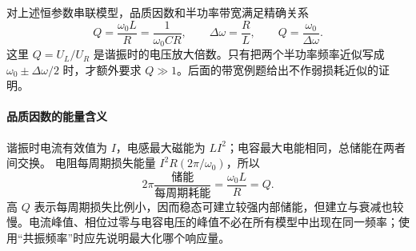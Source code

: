 对上述恒参数串联模型，品质因数和半功率带宽满足精确关系
\begin{equation}
 Q=\frac{\omega_0L}{R}=\frac1{\omega_0CR},
\qquad \Delta\omega=\frac{R}{L},\qquad Q=\frac{\omega_0}{\Delta\omega}.
\end{equation}
这里 $Q=U_L/U_R$ 是谐振时的电压放大倍数。只有把两个半功率频率近似写成
$\omega_0\pm\Delta\omega/2$ 时，才额外要求 $Q\gg1$。后面的带宽例题给出不作弱损耗近似的证明。


\paragraph{品质因数的能量含义}
谐振时电流有效值为 $I$，电感最大磁能为 $LI^2$；电容最大电能相同，总储能在两者间交换。
电阻每周期损失能量 $I^2R(2\pi/\omega_0)$，所以
\[
 2\pi\frac{\text{储能}}{\text{每周期耗能}}
 =\frac{\omega_0L}{R}=Q.
\]
高 $Q$ 表示每周期损失比例小，因而稳态可建立较强内部储能，但建立与衰减也较慢。电流峰值、相位过零与电容电压的峰值不必在所有模型中出现在同一频率；使用“共振频率”时应先说明最大化哪个响应量。


